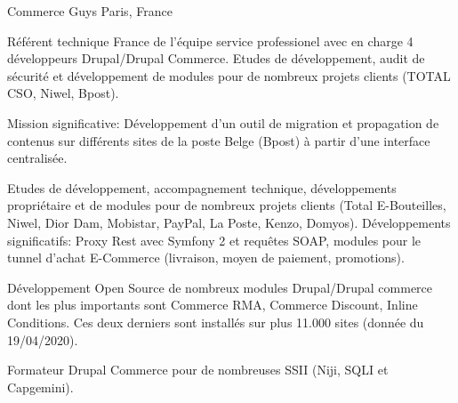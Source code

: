\cventry
{} %
{Commerce Guys} %
{Paris, France} %
{} %
{
\begin{cvsubentries}
    \begin{cvitems} %
        \item
        {
        Référent technique France de l'équipe service professionel avec en charge 4
        développeurs Drupal/Drupal Commerce. Etudes de développement, audit de sécurité et
        développement de modules pour de nombreux projets clients (TOTAL CSO, Niwel, Bpost).
        }
        \item
        {
        Mission significative: Développement d'un outil de migration et propagation de contenus
        sur différents sites de la poste Belge (Bpost) à partir d'une interface centralisée.
        }
    \end{cvitems}
    \begin{cvitems} %
        \item
        {
        Etudes de développement, accompagnement technique, développements propriétaire et de modules
        pour de nombreux projets clients (Total E-Bouteilles, Niwel, Dior Dam, Mobistar, PayPal, 
        La Poste, Kenzo, Domyos). Développements significatifs: Proxy Rest avec Symfony 2 et 
        requêtes SOAP, modules pour le tunnel d'achat E-Commerce (livraison, moyen de paiement, promotions).
        }
        \item
        {
        Développement Open Source de nombreux modules Drupal/Drupal commerce dont les plus importants sont
        Commerce RMA, Commerce Discount, Inline Conditions. Ces deux derniers sont installés sur plus 11.000
        sites (donnée du 19/04/2020).
        }
        \item
        {
        Formateur Drupal Commerce pour de nombreuses SSII (Niji, SQLI et Capgemini).
        }
    \end{cvitems}
\end{cvsubentries}
}